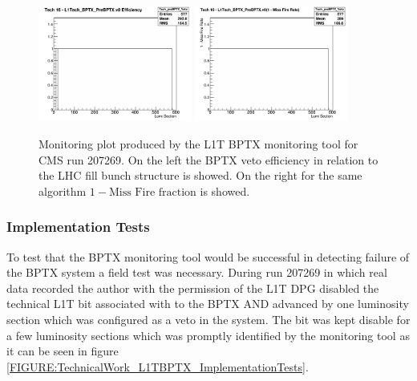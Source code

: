 \begin{figure}[!htb]
\centering
\includegraphics[width=0.45\textwidth]{Chapter03/L1TOnline/Images/L1TDQM_Online_Run207269_L1TBPTX_Efficiency_Tech_preBPTX_Veto.png}
\includegraphics[width=0.45\textwidth]{Chapter03/L1TOnline/Images/L1TDQM_Online_Run207269_L1TBPTX_MissFire_Tech_preBPTX_Veto.png}
\caption{Monitoring plot produced by the \gls{L1T} \gls{BPTX} monitoring tool for \gls{CMS} run 207269. On the left the \gls{BPTX} veto efficiency in relation to the \gls{LHC} fill bunch structure is showed. On the right for the same algorithm $1 - \text{Miss Fire fraction}$ is showed.}
\label{FIGURE:TechnicalWork_BPTXMonitoring}
\end{figure}

\subsubsection{Implementation Tests}


To test that the \gls{BPTX} monitoring tool would be successful in detecting failure of the \gls{BPTX} system a field test was necessary. During run 207269 in which real data recorded the author with the permission of the \gls{L1T} \gls{DPG} disabled the technical \gls{L1T} bit associated with to the \gls{BPTX} AND advanced by one luminosity section which was configured as a veto in the system. The bit was kept disable for a few luminosity sections which was promptly identified by the monitoring tool as it can be seen in figure \ref{FIGURE:TechnicalWork_L1TBPTX_ImplementationTests}.


